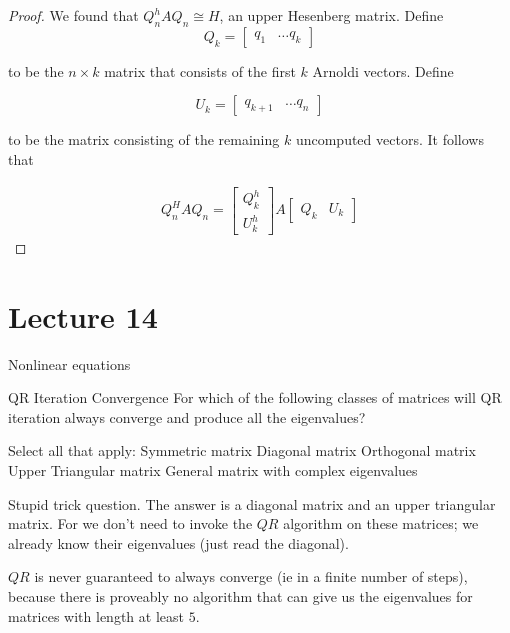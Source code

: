 \documentclass[../main.tex]{subfiles}
\begin{document}
\begin{proof}
    We found that $Q_n^h A Q_n \cong H$, an upper Hesenberg matrix. Define 
    \[
        Q_{k} = \begin{bmatrix}
            q_1 & \dots q_k
        \end{bmatrix}
    \]

    to be the $n \times k$ matrix that consists of the first $k$ Arnoldi vectors. Define

    \[
        U_{k} = \begin{bmatrix}
            q_{k+1} & \dots q_{n}
        \end{bmatrix}
    \]

    to be the matrix consisting of the remaining $k$ uncomputed vectors. It follows that

    \begin{align*}
        Q_n^H A Q_n = 
        \begin{bmatrix}
            Q_k^h \\
            U_k^h
        \end{bmatrix}
        A
        \begin{bmatrix}
            Q_k & U_k
        \end{bmatrix}
    \end{align*}
\end{proof}

\section{Lecture 14}{Nonlinear equations}
\begin{problem}
    QR Iteration Convergence
For which of the following classes of matrices will QR iteration always converge and produce all the eigenvalues?

Select all that apply:
Symmetric matrix
Diagonal matrix
Orthogonal matrix
Upper Triangular matrix
General matrix with complex eigenvalues
\end{problem}

\begin{solution}
    Stupid trick question. The answer is a diagonal matrix and an upper triangular matrix. For we don't need to invoke the $QR$ algorithm on these matrices; we already know their eigenvalues (just read the diagonal).
    
    $QR$ is never guaranteed to always converge (ie in a finite number of steps), because there is proveably no algorithm that can give us the eigenvalues for matrices with length at least $5$. 
\end{solution}
\end{document}
